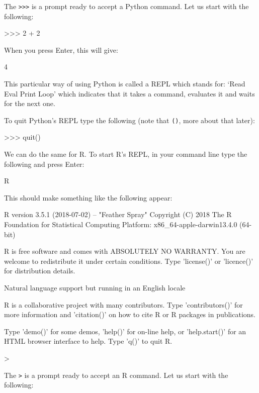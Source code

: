 The \texttt{>>>} is a prompt ready to accept a Python command. Let
us start with the following:

\begin{pyin} %
>>> 2 + 2
\end{pyin}

When you press Enter, this will give:

\begin{pyout} %
4
\end{pyout}

This particular way of using Python is called a REPL which stands for: `Read
Eval Print Loop' which indicates that it takes a command, evaluates it and waits
for the next one.

To quit Python's REPL type the following (note that \texttt{()},
more about that later):

\begin{pyin} %
>>> quit()
\end{pyin}

We can do the same for R. To start R's REPL, in your command line type the
following and press Enter:

\begin{cliin}
R
\end{cliin}

This should make something like the following appear:

\begin{cliout}
R version 3.5.1 (2018-07-02) -- "Feather Spray"
Copyright (C) 2018 The R Foundation for Statistical Computing
Platform: x86_64-apple-darwin13.4.0 (64-bit)

R is free software and comes with ABSOLUTELY NO WARRANTY.
You are welcome to redistribute it under certain conditions.
Type 'license()' or 'licence()' for distribution details.

  Natural language support but running in an English locale

R is a collaborative project with many contributors.
Type 'contributors()' for more information and
'citation()' on how to cite R or R packages in publications.

Type 'demo()' for some demos, 'help()' for on-line help, or
'help.start()' for an HTML browser interface to help.
Type 'q()' to quit R.

>
\end{cliout}

The \texttt{>} is a prompt ready to accept an R command. Let
us start with the following:

